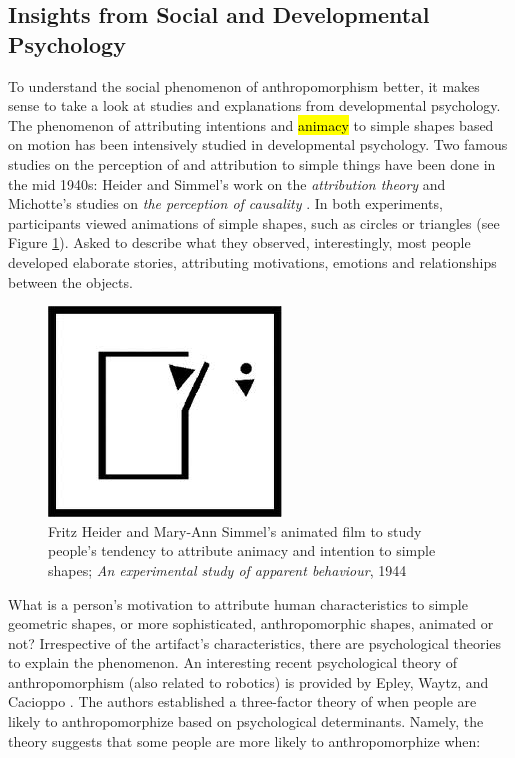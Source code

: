 \documentclass[lettersize, apacite, twoside, HRI]{apa_HRI}
\begin{document}
\subsection{Insights from Social and Developmental Psychology}
\label{sec:psychological-factors}

	To understand the social phenomenon of anthropomorphism better, it makes sense to take a look at studies and explanations from developmental psychology. The phenomenon of attributing intentions and \hl{animacy} to simple shapes based on motion has been intensively studied in developmental psychology. Two famous studies on the perception of and attribution to simple things have been done in the mid 1940s: Heider and Simmel's work on the \textit{attribution theory} \cite{heider_experimental_1944} and Michotte's studies on \textit{the perception of causality} \cite{michotte_perception_1963}. In both experiments, participants viewed animations of simple shapes, such as circles or triangles (see Figure \ref{fig:animacy_attribution}). Asked to describe what they observed, interestingly, most people developed elaborate stories, attributing motivations, emotions and relationships between the objects.

\begin{figure}\centering
  \includegraphics[scale=0.6]{heider-simmel_animation.jpeg}
 \caption{Fritz Heider and Mary-Ann Simmel's animated film to study people's tendency to attribute animacy and intention to simple shapes; \textit{An experimental study of apparent behaviour}, 1944}
 \label{fig:animacy_attribution}       %
 \end{figure}

	What is a person's motivation to attribute human characteristics to simple geometric shapes, or more sophisticated, anthropomorphic shapes, animated or not? Irrespective of the artifact's characteristics, there are psychological theories to explain the phenomenon. An interesting recent psychological theory of anthropomorphism (also related to robotics) is provided by Epley, Waytz, and Cacioppo \cite{epley_seeing_2007}. The authors established a three-factor theory of when people are likely to anthropomorphize based on psychological determinants. Namely, the theory suggests that some people are more likely to anthropomorphize when:
\end{document}
